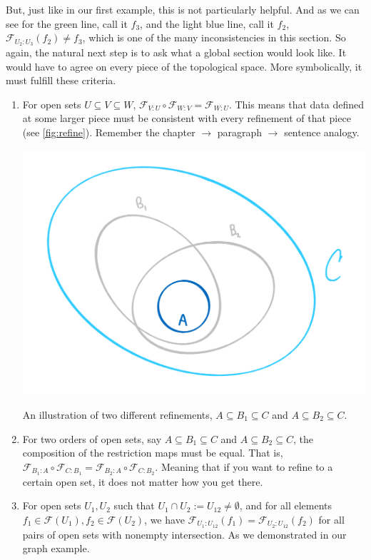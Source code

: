 \documentclass{tufte-handout}
\newcommand{\F}{\mathcal{F}}
\begin{document}
But, just like in our first example, this is not particularly helpful. And as we can see for the green line, call it $f_3$, and the light blue line, call it $f_2$, $\F_{U_2:U_3}(f_2) \neq f_3$, which is one of the many inconsistencies in this section. So again, the natural next step is to ask what a global section would look like. It would have to agree on every piece of the topological space. More symbolically, it must fulfill these criteria.
\begin{enumerate}
    \item For open sets $U \subseteq V \subseteq W$, $\F_{V:U} \circ \F_{W:V} = \F_{W:U}$. This means that data defined at some larger piece must be consistent with every refinement of that piece (see \cref{fig:refine}). Remember the chapter $\rightarrow$ paragraph $\rightarrow$ sentence analogy.
    
    \begin{marginfigure}%
      \includegraphics[width=\linewidth]{tworefine.png}
      \caption{An illustration of two different refinements, $A \subseteq B_1 \subseteq C$ and $A \subseteq B_2 \subseteq C$.}
      \label{fig:tworefine}
    \end{marginfigure}
    
    \item For two orders of open sets, say $A \subseteq B_1 \subseteq C$ and $A \subseteq B_2 \subseteq C$, the composition of the restriction maps must be equal. That is, $\F_{B_1:A} \circ \F_{C:B_1} = \F_{B_2:A} \circ \F_{C:B_2}$. Meaning that if you want to refine to a certain open set, it does not matter how you get there.
    
    \item For open sets $U_1,U_2$ such that $U_1 \cap U_2 := U_{12} \neq \emptyset$, and for all elements $f_1 \in \F(U_1), f_2 \in \F(U_2)$, we have $\F_{U_1:U_{12}}(f_1) = \F_{U_2:U_{12}}(f_2)$ for all pairs of open sets with nonempty intersection. As we demonstrated in our graph example.

\end{enumerate}
\end{document}
